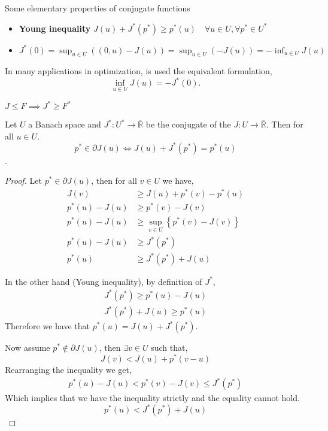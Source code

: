 \begin{remark}
Some elementary properties of conjugate functions
\begin{itemize}
	\item  \textbf{Young inequality} $J(u)+J^*(p^*)\geq p^*(u) \quad \forall u \in U, \forall p^* \in U^*$
	\item  $J^*(0)=\sup_{u\in U}\left((0,u)-J(u)\right)=\sup_{u\in U}\left(-J(u)\right)=-\inf_{u\in U}J(u)$
\end{itemize}
In many applications in optimization, is used the equivalent formulation,
\[
\inf_{u\in U}J(u)=-J^*(0).
\]
\end{remark}
$J\leq F \implies J^*\geq F^*$

\begin{theorem}
	Let $U$ a Banach space and $J^*: U^* \rightarrow \overline{\mathbb{R}}$ be the conjugate of the $J:U\rightarrow \overline{\mathbb{R}}$. Then for all $u\in U$. \[p^* \in \partial J(u) \iff J(u)+J^*(p^*)=p^*(u)\]. \label{th7: conjugate plus functional}
	\begin{proof}
		Let $p^* \in \partial J(u)$, then for all $v \in U$ we have,
		\begin{align*}
			J(v)&\geq J(u) +p^*(v)-p^*(u) \\
			p^*(u)-J(u)&\geq p^*(v)-J(v) \\
			p^*(u)-J(u)&\geq \sup_{v\in U} \left\lbrace p^*(v)-J(v)\right\rbrace\\
			p^*(u)-J(u)&\geq J^*(p^*)\\
			p^*(u)&\geq J^*(p^*)+J(u)
		\end{align*}
		
		In the other hand (Young inequality), by definition of $J^*$, 
		\begin{align*}
			J^*(p^*) \geq p^*(u)-J(u)\\
			J^*(p^*)+J(u) \geq p^*(u)
		\end{align*}
		Therefore we have that $p^*(u)= J(u)+J^*(p^*)$.
		
		Now assume $p^*\notin \partial J(u)$, then $\exists v \in U$ such that,
		\[
			J(v)< J(u)+p^*(v-u)
		\]
		Rearranging the inequality we get,
		\begin{align*}
			p^*(u)-J(u)<p^*(v)-J(v)\leq J^*(p^*)
		\end{align*}
		Which implies that we have the inequality strictly and the equality cannot hold. 
		\[
			p^*(u)<J^*(p^*)+J(u)
		\]
		
	\end{proof}
\end{theorem}
